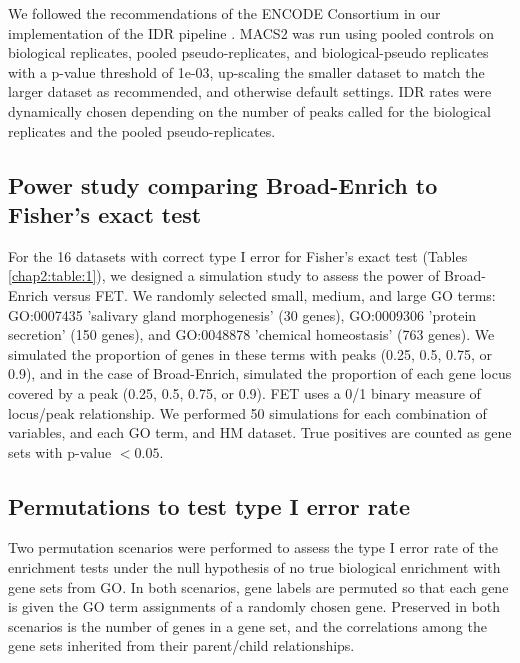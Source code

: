 We followed the recommendations of the ENCODE Consortium in our implementation of the IDR pipeline \cite{Landt:2012cl}. MACS2 was run using pooled controls on biological replicates, pooled pseudo-replicates, and biological-pseudo replicates with a p-value threshold of 1e-03, up-scaling the smaller dataset to match the larger dataset as recommended, and otherwise default settings. IDR rates were dynamically chosen depending on the number of peaks called for the biological replicates and the pooled pseudo-replicates.

\subsection{Power study comparing Broad-Enrich to Fisher's exact test}
\label{broadenrich_methods_power}
For the 16 datasets with correct type I error for Fisher's exact test (Tables \ref{chap2:table:1}), we designed a simulation study to assess the power of Broad-Enrich versus FET. We randomly selected small, medium, and large GO terms: GO:0007435 'salivary gland morphogenesis' (30 genes), GO:0009306 'protein secretion' (150 genes), and GO:0048878 'chemical homeostasis' (763 genes). We simulated the proportion of genes in these terms with peaks (0.25, 0.5, 0.75, or 0.9), and in the case of Broad-Enrich, simulated the proportion of each gene locus covered by a peak (0.25, 0.5, 0.75, or 0.9). FET uses a 0/1 binary measure of locus/peak relationship. We performed 50 simulations for each combination of variables, and each GO term, and HM dataset. True positives are counted as gene sets with p-value $< 0.05$.

\subsection{Permutations to test type I error rate}
\label{broadenrich_methods_permutations}

Two permutation scenarios were performed to assess the type I error rate of the enrichment tests under the null hypothesis of no true biological enrichment with gene sets from GO. In both scenarios, gene labels are permuted so that each gene is given the GO term assignments of a randomly chosen gene. Preserved in both scenarios is the number of genes in a gene set, and the correlations among the gene sets inherited from their parent/child relationships.

